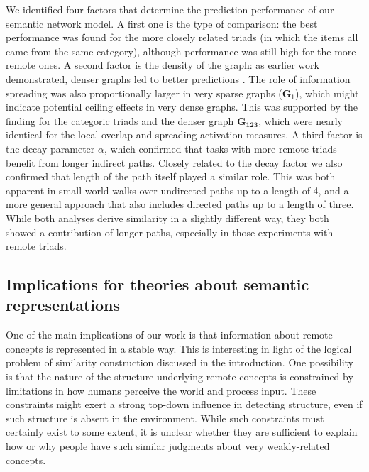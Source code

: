 \documentclass[doc]{apa6}
\begin{document}
We identified four factors that determine the prediction performance of our semantic network model. A first one is the type of comparison: the best performance was found for the more closely related triads (in which the items all came from the same category), although performance was still high for the more remote ones. A second factor is the density of the graph: as earlier work demonstrated, denser graphs led to better predictions \parencite{DeDeyne2013b}. The role of information spreading was also proportionally larger in very sparse graphs ($\mathbf{G}_1$), which might indicate potential ceiling effects in very dense graphs. This was supported by the finding for the categoric triads and the denser graph $\mathbf{G_{123}}$, which were nearly identical for the local overlap and spreading activation measures. A third factor is the decay parameter $\alpha$, which confirmed that tasks with more remote triads benefit from longer indirect paths. Closely related to the decay factor we also confirmed that length of the path itself played a similar role. This was both apparent in small world walks over undirected paths up to a length of 4, and a more general approach that also includes directed paths up to a length of three. While both analyses derive similarity in a slightly different way, they both showed a contribution of longer paths, especially in those experiments with remote triads.

\bigskip



\subsection{Implications for theories about semantic representations}

One of the main implications of our work is that information about remote concepts is represented in a stable way. This is interesting in light of the logical problem of similarity construction discussed in the introduction. One possibility is that the nature of the structure underlying remote concepts is constrained by limitations in how humans perceive the world and process input. These constraints might exert a strong top-down influence in detecting structure, even if such structure is absent in the environment. While such constraints must certainly exist to some extent, it is unclear whether they are sufficient to explain how or why people have such similar judgments about very weakly-related concepts.
\end{document}
